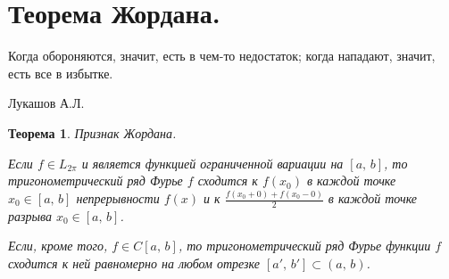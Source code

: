 \documentclass[a4paper,12pt]{article}
\theoremstyle{plain}
\newtheorem{theorem}{Теорема}[section]
\theoremstyle{definition}
\theoremstyle{remark}
\begin{document}
\section{Теорема Жордана.}

\epigraph{Когда обороняются, значит, есть в чем-то недостаток; когда нападают, значит, есть все в избытке.}{Лукашов А.Л.}

\begin{theorem}
	Признак Жордана.

	Если $f \in L_{2\pi}$ и является функцией ограниченной вариации на $[a,\,b]$, то тригонометрический ряд Фурье $f$ сходится к $f(x_0)$ в каждой точке $x_0 \in [a,\,b]$ непрерывности $f(x)$ и к $\frac{f(x_0 + 0) + f(x_0 - 0)}{2}$ в каждой точке разрыва $x_0 \in [a,\,b]$.

	Если, кроме того, $f \in C[a,\,b]$, то тригонометрический ряд Фурье функции $f$ сходится к ней равномерно на любом отрезке $[a',\,b'] \subset (a,\,b)$.
\end{theorem}
\end{document}
